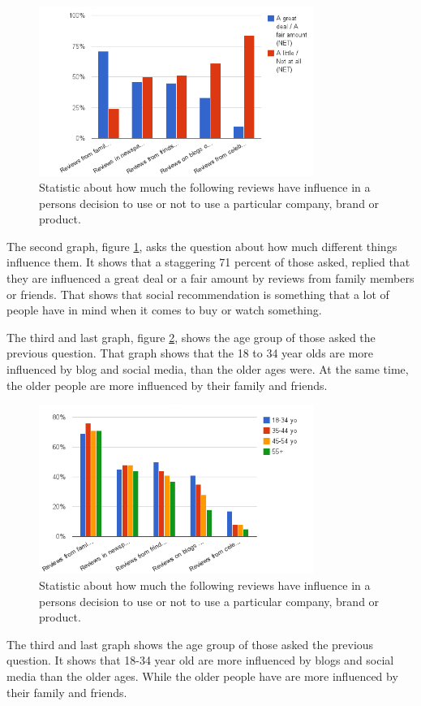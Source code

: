 \begin{figure}[H]
\centering
\includegraphics[width=0.8\textwidth]{Images/teori2.png}
\caption{Statistic about how much the following reviews have influence in a persons decision to use or not to use a particular company, brand or product.}
\label{Teori2}
\end{figure}

The second graph, figure \ref{Teori2}, asks the question about how much different things influence them. It shows that a staggering 71 percent of those asked, replied that they are influenced a great deal or a fair amount by reviews from family members or friends. That shows that social recommendation is something that a lot of people have in mind when it comes to buy or watch something.

The third and last graph, figure \ref{Teori3}, shows the age group of those asked the previous question. That graph shows that the 18 to 34 year olds are more influenced by blog and social media, than the older ages were. At the same time, the older people are more influenced by their family and friends.

\begin{figure}[H]
\centering
\includegraphics[width=0.8\textwidth]{Images/teori3.png}
\caption{Statistic about how much the following reviews have influence in a persons decision to use or not to use a particular company, brand or product.}
\label{Teori3}
\end{figure}

The third and last graph shows the age group of those asked the previous question. It shows that 18-34 year old are more influenced by blogs and social media than the older ages. While the older people have are more influenced by their family and friends.